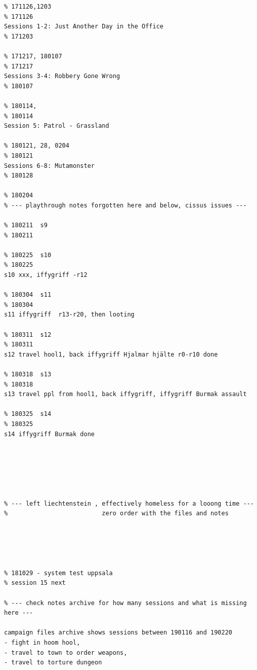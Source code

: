 \vvsmall \begin{verbatim}
% 171126,1203                                                           % 171126
Sessions 1-2: Just Another Day in the Office                            % 171203

% 171217, 180107                                                        % 171217
Sessions 3-4: Robbery Gone Wrong                                        % 180107

% 180114,                                                               % 180114
Session 5: Patrol - Grassland

% 180121, 28, 0204                                                      % 180121
Sessions 6-8: Mutamonster                                               % 180128
                                                                        % 180204
% --- playthrough notes forgotten here and below, cissus issues ---

% 180211  s9                                                            % 180211

% 180225  s10                                                           % 180225
s10 xxx, iffygriff -r12

% 180304  s11                                                           % 180304
s11 iffygriff  r13-r20, then looting

% 180311  s12                                                           % 180311
s12 travel hool1, back iffygriff Hjalmar hjälte r0-r10 done

% 180318  s13                                                           % 180318
s13 travel ppl from hool1, back iffygriff, iffygriff Burmak assault

% 180325  s14                                                           % 180325
s14 iffygriff Burmak done






% --- left liechtenstein , effectively homeless for a looong time ---
%                          zero order with the files and notes





% 181029 - system test uppsala
% session 15 next

% --- check notes archive for how many sessions and what is missing here ---

campaign files archive shows sessions between 190116 and 190220
- fight in hoom hool, 
- travel to town to order weapons, 
- travel to torture dungeon




\end{verbatim}
